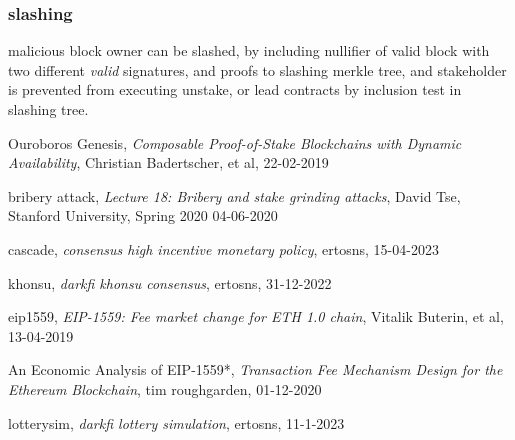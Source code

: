 \documentclass[a4paper]{article}
\begin{document}
  \subsubsection {slashing}
  malicious block owner can be slashed, by including nullifier of valid block with two different \emph{valid} signatures, and proofs to slashing merkle tree, and stakeholder is prevented from executing unstake, or lead contracts by inclusion test in slashing tree.




\begin{thebibliography}{999}

  Ouroboros Genesis,
  \emph{Composable Proof-of-Stake Blockchains with Dynamic Availability},
  Christian Badertscher, et al,
  22-02-2019

  bribery attack,
  \emph{Lecture 18: Bribery and stake grinding attacks},
  David Tse,
  Stanford University, Spring 2020
  04-06-2020

  cascade,
  \emph{consensus high incentive monetary policy},
  ertosns,
  15-04-2023

  khonsu,
  \emph{darkfi khonsu consensus},
  ertosns,
  31-12-2022

  eip1559,
  \emph{EIP-1559: Fee market change for ETH 1.0 chain},
  Vitalik Buterin, et al,
  13-04-2019

  An Economic Analysis of EIP-1559*,
  \emph{Transaction Fee Mechanism Design for the Ethereum Blockchain},
  tim roughgarden,
  01-12-2020

  lotterysim,
  \emph{darkfi lottery simulation},
  ertosns,
  11-1-2023
\end{thebibliography}

\printindex
\end{document}
